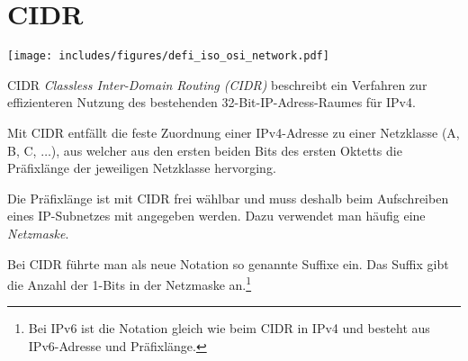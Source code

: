 \section{CIDR}

\texttt{[image: includes/figures/defi\_iso\_osi\_network.pdf]}

\begin{defi}{CIDR}
    \emph{Classless Inter-Domain Routing (CIDR)} beschreibt ein Verfahren zur effizienteren Nutzung des bestehenden 32-Bit-IP-Adress-Raumes für IPv4.

    Mit CIDR entfällt die feste Zuordnung einer IPv4-Adresse zu einer Netzklasse (A, B, C, $\ldots$), aus welcher aus den ersten beiden Bits des ersten Oktetts die Präfixlänge der jeweiligen Netzklasse hervorging.

    Die Präfixlänge ist mit CIDR frei wählbar und muss deshalb beim Aufschreiben eines IP-Subnetzes mit angegeben werden.
    Dazu verwendet man häufig eine \emph{Netzmaske}.

    Bei CIDR führte man als neue Notation so genannte Suffixe ein.
    Das Suffix gibt die Anzahl der 1-Bits in der Netzmaske an.\footnote{Bei IPv6 ist die Notation gleich wie beim CIDR in IPv4 und besteht aus IPv6-Adresse und Präfixlänge.}
\end{defi}

